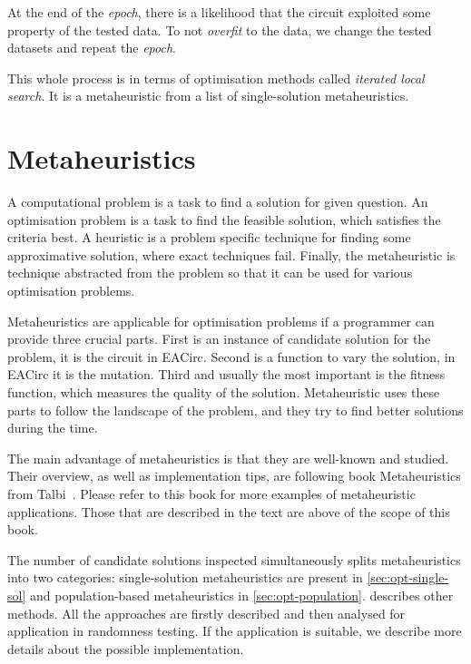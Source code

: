 \documentclass[
  print, %
  Table,   %
  nolof,     %
  nolot,     %
  11pt, %
  oneside  %
]{fithesis3}
\begin{document}
At the end of the \textit{epoch}, there is a likelihood that the circuit exploited some property of the tested data. To not \textit{overfit} to the data, we change the tested datasets and repeat the \textit{epoch}.

This whole process is in terms of optimisation methods called \textit{iterated local search}. It is a metaheuristic from a list of single-solution metaheuristics.


\chapter{Metaheuristics}
\label{chap:metaheuristics}

A computational problem is a task to find a solution for given question. An optimisation problem is a task to find the feasible solution, which satisfies the criteria best. A heuristic is a problem specific technique for finding some approximative solution, where exact techniques fail. Finally, the metaheuristic is technique abstracted from the problem so that it can be used for various optimisation problems.

Metaheuristics are applicable for optimisation problems if a programmer can provide three crucial parts. First is an instance of candidate solution for the problem, it is the circuit in EACirc. Second is a function to vary the solution, in EACirc it is the mutation. Third and usually the most important is the fitness function, which measures the quality of the solution. Metaheuristic uses these parts to follow the landscape of the problem, and they try to find better solutions during the time.

The main advantage of metaheuristics is that they are well-known and studied. Their overview, as well as implementation tips, are following book Metaheuristics from Talbi~\cite{talbi2009metaheuristics}. Please refer to this book for more examples of metaheuristic applications. Those that are described in the text are above of the scope of this book.

The number of candidate solutions inspected simultaneously splits metaheuristics into two categories: single-solution metaheuristics are present in \cref{sec:opt-single-sol} and population-based metaheuristics in \cref{sec:opt-population}.  describes other methods. All the approaches are firstly described and then analysed for application in randomness testing. If the application is suitable, we describe more details about the possible implementation.
\end{document}
